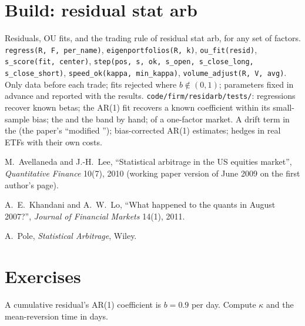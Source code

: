 \section{Build: residual stat arb}\label{bld:s1:residual-and-principal-component-stat-arb:residarb}

\begin{build}
 Residuals, OU fits,  and the trading rule of residual stat arb, for any set of factors.
 \texttt{regress(R, F, per\_name)}, \texttt{eigenportfolios(R, k)}, \texttt{ou\_fit(resid)}, \texttt{s\_score(fit, center)},
\texttt{step(pos, s, ok, s\_open, s\_close\_long, s\_close\_short)}, \texttt{speed\_ok(kappa, min\_kappa)}, \texttt{volume\_adjust(R, V, avg)}.
 Only data before each trade; fits rejected where $b \notin (0, 1)$; parameters fixed in advance and reported with the results.
 \texttt{code/firm/residarb/tests/}: regressions recover known betas; the AR(1) fit recovers a known coefficient within its
small-sample bias; the  and the band by hand;  of a one-factor market.
 A drift term in the  (the paper's ``modified ''); bias-corrected AR(1) estimates; hedges in real ETFs with their own costs.
\end{build}

\begin{omsources}
\item M.~Avellaneda and J.-H.~Lee, ``Statistical arbitrage in the US equities market'', \emph{Quantitative Finance} 10(7), 2010 (working paper version of
June 2009 on the first author's page).
\item A.~E.~Khandani and A.~W.~Lo, ``What happened to the quants in August 2007?'', \emph{Journal of Financial Markets} 14(1), 2011.
\item A.~Pole, \emph{Statistical Arbitrage}, Wiley.
\end{omsources}

\section{Exercises}

\begin{exercise}[$\star$]\label{exo:s1:residual-and-principal-component-stat-arb:1}
A cumulative residual's AR(1) coefficient is $b = 0.9$ per day. Compute $\kappa$ and the mean-reversion time in days.
\end{exercise}

